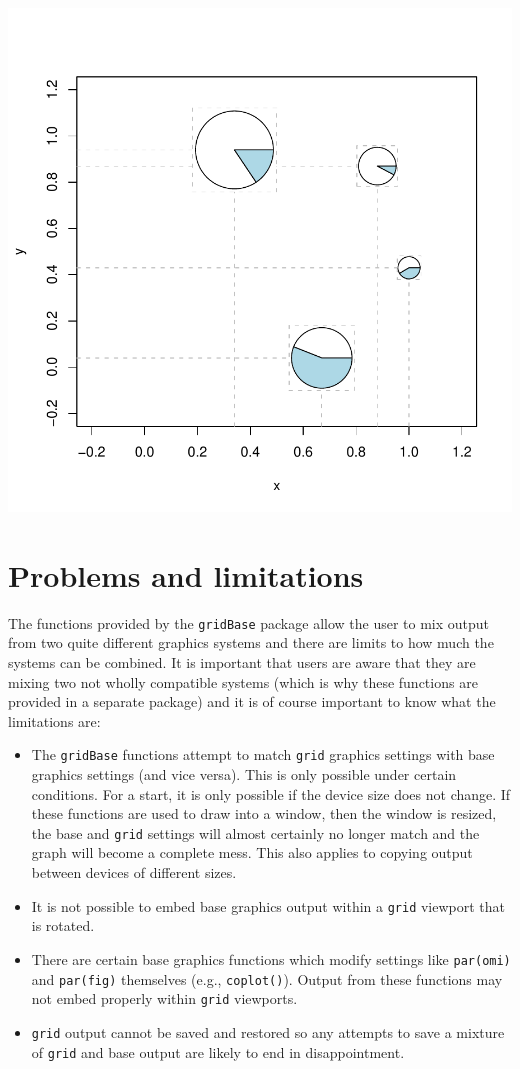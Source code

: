 \documentclass[a4paper]{article}
\newcommand{\grid}{{\tt grid}}
\newcommand{\gridBase}{{\tt gridBase}}
\begin{document}
\includegraphics{gridBase-complex}
\section*{Problems and limitations}

The functions provided by the \gridBase{} package allow the user
to mix output from two quite different graphics systems and there 
are limits to how much the systems can be combined.  It is important
that users are aware that they are mixing two not wholly compatible
systems (which is why these functions are provided in a separate 
package) and it is of course important to know what the limitations
are: 

\begin{itemize}
\item 
The \gridBase{} functions attempt to
match \grid{} graphics settings with base graphics settings (and vice versa). 
 This 
is only possible under certain conditions.  For a start, it is only 
possible if the device size does not change.  If these functions are
used to draw into a window,  then the window is resized, the base and 
\grid{} settings will almost certainly no longer match and the graph
will become a complete mess.  This also applies to copying output between
devices of different sizes.

\item
It is not possible to embed base graphics output within a 
\grid{} viewport that is rotated.

\item
There are certain base graphics functions 
which modify settings
like \verb|par(omi)| and \verb|par(fig)| themselves (e.g., \verb|coplot()|).
  Output from
these functions may not embed properly
within \grid{} viewports.

\item
\grid{} output cannot be
saved and restored so any attempts to save a mixture of \grid{} and
base output are likely
to end in disappointment.

\end{itemize}
\end{document}
